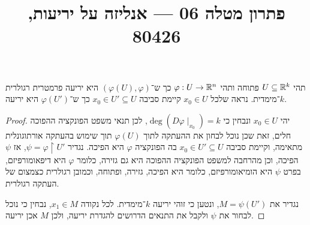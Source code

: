 
\title{פתרון מטלה 06 --- אנליזה על יריעות, 80426}

\DeclareMathOperator{\vol}{vol}


\maketitle
\maketitleprint[blue]

\question{}
תהי $U \subseteq \mathbb{R}^k$ פתוחה ותהי $\varphi : U \to \mathbb{R}^n$ כך ש־$(\varphi(U), \varphi)$ היא יריעה פרמטרית רגולרית $k$־מימדית.
נראה שלכל $x_0 \in U$ קיימת סביבה $x_0 \in U' \subseteq U$ כך ש־$\varphi(U')$ היא יריעה.
\begin{proof}
	יהי $x_0 \in U$ ונבחין כי $\deg(D \varphi \mid_{x_0}) = k$, לכן תנאי משפט הפונקציה ההפוכה חלים,
	זאת שכן נוכל לבחון את ההעתקה לתוך $\varphi(U)$ תוך שימוש בהעתקה אורתוגונלית מתאימה,
	וקיימת סביבה $x_0 \in U' \subseteq U$ בה הפונקציה $\varphi$ היא הפיכה.
	נגדיר $\psi = \varphi \restriction U'$, אז $\psi$ הפיכה, וכן מהרחבה למשפט הפונקציה ההפוכה היא גם גזירה, כלומר $\varphi$ היא דיפאומורפיזם, בפרט $\psi$ היא הומיאומורפיזם,
	כלומר היא הפיכה, גזירה, ופתוחה, וכמובן רגולרית כצמצום של העתקה רגולרית.

	נגדיר את $M = \psi(U')$, ונטען כי זוהי יריעה $k$־מימדית.
	לכל נקודה $x_1 \in M$, נבחין כי נוכל לבחור את $\psi$ ולקבל את התנאים הדרושים להגדרת יריעה, ולכן $M$ אכן יריעה.
\end{proof}

